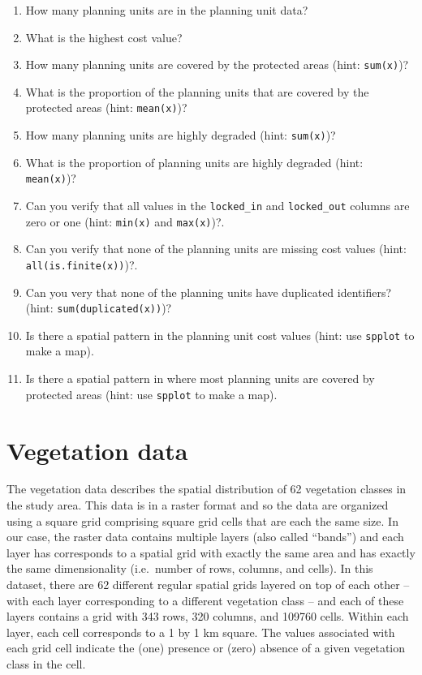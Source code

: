 \documentclass[12pt,]{book}
\providecommand{\tightlist}{%
  \setlength{\itemsep}{0pt}\setlength{\parskip}{0pt}}
\let\BeginKnitrBlock\begin \let\EndKnitrBlock\end
\begin{document}
\BeginKnitrBlock{rmdquestion}
\begin{enumerate}
\def\labelenumi{\arabic{enumi}.}
\tightlist
\item
  How many planning units are in the planning unit data?
\item
  What is the highest cost value?
\item
  How many planning units are covered by the protected areas (hint:
  \texttt{sum(x)})?
\item
  What is the proportion of the planning units that are covered by the
  protected areas (hint: \texttt{mean(x)})?
\item
  How many planning units are highly degraded (hint: \texttt{sum(x)})?
\item
  What is the proportion of planning units are highly degraded (hint:
  \texttt{mean(x)})?
\item
  Can you verify that all values in the \texttt{locked\_in} and
  \texttt{locked\_out} columns are zero or one (hint: \texttt{min(x)}
  and \texttt{max(x)})?.
\item
  Can you verify that none of the planning units are missing cost values
  (hint: \texttt{all(is.finite(x))})?.
\item
  Can you very that none of the planning units have duplicated
  identifiers? (hint: \texttt{sum(duplicated(x))})?
\item
  Is there a spatial pattern in the planning unit cost values (hint: use
  \texttt{spplot} to make a map).
\item
  Is there a spatial pattern in where most planning units are covered by
  protected areas (hint: use \texttt{spplot} to make a map).
\end{enumerate}
\EndKnitrBlock{rmdquestion}

\clearpage

\section{Vegetation data}\label{vegetation-data}

The vegetation data describes the spatial distribution of 62 vegetation
classes in the study area. This data is in a raster format and so the
data are organized using a square grid comprising square grid cells that
are each the same size. In our case, the raster data contains multiple
layers (also called ``bands'') and each layer has corresponds to a
spatial grid with exactly the same area and has exactly the same
dimensionality (i.e.~number of rows, columns, and cells). In this
dataset, there are 62 different regular spatial grids layered on top of
each other -- with each layer corresponding to a different vegetation
class -- and each of these layers contains a grid with 343 rows, 320
columns, and 109760 cells. Within each layer, each cell corresponds to a
1 by 1 km square. The values associated with each grid cell indicate the
(one) presence or (zero) absence of a given vegetation class in the
cell.
\end{document}
